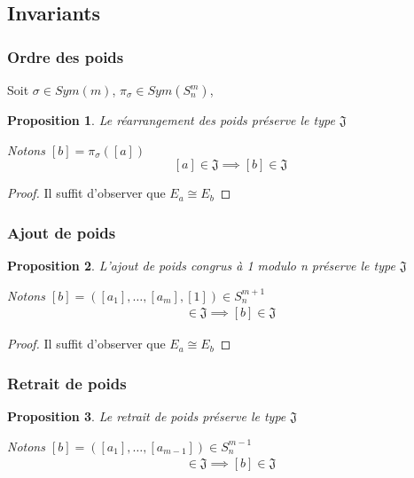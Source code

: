 \documentclass{article}
\newtheorem{proposition}{Proposition}
\begin{document}
\subsection{Invariants}

\subsubsection{Ordre des poids}

Soit $\sigma \in Sym(m)$, $\pi_{\sigma} \in Sym(S_n^m)$, 

\begin{proposition}
    Le réarrangement des poids préserve le type $\mathfrak{J}$

    Notons $[b] = \pi_{\sigma}([a])$
    \[ [a] \in \mathfrak{J} \implies [b] \in \mathfrak{J} \]
\end{proposition}

\begin{proof}
    Il suffit d'observer que $E_a \cong E_b$
\end{proof}

\subsubsection{Ajout de poids}

\begin{proposition}
    L'ajout de poids congrus à 1 modulo n préserve le type $\mathfrak{J}$

    Notons $[b] = ([a_1], \dots, [a_m], [1]) \in S_n^{m+1}$
    \begin{align*}
        [a] \in \mathfrak{J} \implies [b] \in \mathfrak{J}
    \end{align*}
\end{proposition}

\begin{proof}
    Il suffit d'observer que $E_a \cong E_b$
\end{proof}

\subsubsection{Retrait de poids}

\begin{proposition}
    Le retrait de poids préserve le type $\mathfrak{J}$

    Notons $[b] = ([a_1], \dots, [a_{m-1}]) \in S_n^{m-1}$
    \begin{align*}
        [a] \in \mathfrak{J} \implies [b] \in \mathfrak{J}
    \end{align*}
\end{proposition}
\end{document}

